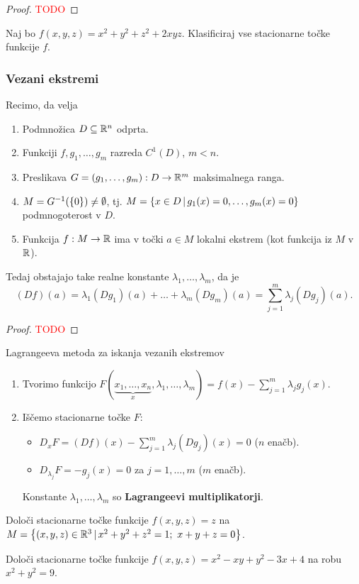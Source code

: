 \begin{proof}
    \textcolor{red}{TODO}
\end{proof}

\begin{zgled}
    Naj bo $f(x,y,z) = x^2+y^2+z^2 + 2xyz$. Klasificiraj vse stacionarne točke funkcije $f$.
\end{zgled}

\subsubsection{Vezani ekstremi}
\begin{izrek}
    Recimo, da velja
    \begin{enumerate}
        \item Podmnožica $D \subseteq \mathbb{R}^n$ odprta.
        \item Funkciji $f, g_1, \ldots, g_m$ razreda $C^1(D)$, $m < n$.
        \item Preslikava $G = (g_1, \ldots, g_m): D \to \mathbb{R}^m$ maksimalnega ranga.
        \item $M = G^{-1}(\left\{0\right\}) \neq \emptyset$, tj. $M = \left\{x \in D \,|\, g_1(x) = 0, \ldots, g_m(x) = 0\right\}$ podmnogoterost v $D$.
        \item Funkcija $f: M \to \mathbb{R}$ ima v točki $a \in M$ lokalni ekstrem (kot funkcija iz $M$ v $\mathbb{R}$).        
    \end{enumerate}
    Tedaj obstajajo take realne konstante $\lambda_1, \ldots, \lambda_m$, da je 
    $$(Df)(a) = \lambda_1 (Dg_1)(a) + \ldots + \lambda_m (Dg_m)(a) = \sum_{j=1}^{m}\lambda_j(Dg_j)(a).$$ 
\end{izrek}

\begin{proof}
    \textcolor{red}{TODO}
\end{proof}

\begin{opomba}
    Lagrangeeva metoda za iskanja vezanih ekstremov
    \begin{enumerate}
        \item Tvorimo funkcijo $F(\underbrace{x_1, \ldots, x_n}_x, \lambda_1, \ldots, \lambda_m) = f(x) - \sum_{j=1}^{m} \lambda_j g_j(x)$.
        \item Iščemo stacionarne točke $F$:
        \begin{itemize}
            \item $D_xF = (Df)(x) - \sum_{j=1}^{m}\lambda_j(Dg_j)(x) = 0$ ($n$ enačb).
            \item $D_{\lambda_j}F = -g_j(x) = 0$ za $j = 1, \ldots, m$ ($m$ enačb).
        \end{itemize}
        Konstante $\lambda_1, \ldots, \lambda_m$ so \textbf{Lagrangeevi multiplikatorji}.
    \end{enumerate}    
\end{opomba}

\begin{zgled}
    Določi stacionarne točke funkcije $f(x,y,z)=z$ na $M = \left\{(x,y,z) \in \mathbb{R}^3 \,|\, x^2+y^2+z^2=1; \ x+ y + z = 0\right\}$.
\end{zgled}

\begin{zgled}
    Določi stacionarne točke funkcije $f(x,y,z)= x^2 - xy +y^2 - 3x +4$ na robu $x^2 + y^2 = 9$.
\end{zgled}